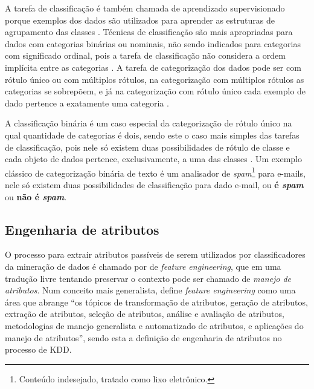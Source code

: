             A tarefa de classificação é também chamada de aprendizado supervisionado porque exemplos dos dados são utilizados para aprender as estruturas de agrupamento das classes \cite[p.~285]{Aggarwal_DMTT_2015}.
            Técnicas de classificação são mais apropriadas para dados com categorias binárias ou nominais, não sendo indicados para categorias com significado ordinal, pois a tarefa de classificação não considera a ordem implícita entre as categorias \cite[p.~147]{TanIDM2014}.
            A tarefa de categorização dos dados pode ser com rótulo único ou com múltiplos rótulos, na categorização com múltiplos rótulos as categorias se sobrepõem, e já na categorização com rótulo único cada exemplo de dado pertence a exatamente uma categoria \cite[p.~67]{Feldman:2006:TMH:1076381} \cite[p.~306]{TanIDM2014}.
            
            A classificação binária é um caso especial da categorização de rótulo único na qual quantidade de categorias é dois, sendo este o caso mais simples das tarefas de classificação, pois nele só existem duas possibilidades de rótulo de classe e cada objeto de dados pertence, exclusivamente, a uma das classes \cite[p.~67]{Feldman:2006:TMH:1076381} \cite[p.~81]{Jo2018TMCIBDC}.
            Um exemplo clássico de categorização binária de texto é um analisador de \textit{spam}\footnote{Conteúdo indesejado, tratado como lixo eletrônico.} para e-mails, nele só existem duas possibilidades de classificação para dado e-mail, ou \textbf{é \textit{spam}} ou \textbf{não é \textit{spam}}.
        
    \subsection{Engenharia de atributos} \label{subsec:Engenharia-de-atributos}
        O processo para extrair atributos passíveis de serem utilizados por classificadores da mineração de dados é chamado por  de \textit{feature engineering}, que em uma tradução livre tentando preservar o contexto pode ser chamado de \textit{manejo de atributos}.
        Num conceito mais generalista,  define \textit{feature engineering} como uma área que abrange ``os tópicos de transformação de atributos, geração de atributos, extração de atributos, seleção de atributos, análise e avaliação de atributos, metodologias de manejo generalista e automatizado de atributos, e aplicações do manejo de atributos'', sendo esta a definição de engenharia de atributos no processo de KDD.
        
